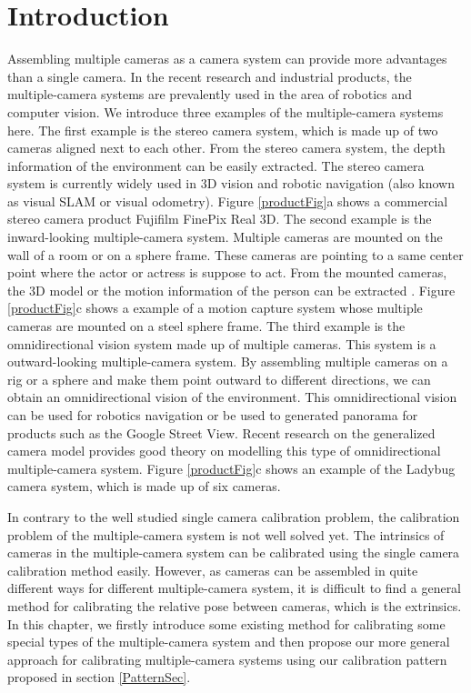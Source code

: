 \documentclass{report}
\begin{document}
\section{Introduction}
Assembling multiple cameras as a camera system can provide more advantages than a single camera. In the recent research and industrial products, the multiple-camera systems are prevalently used in the area of robotics and computer vision. We introduce three examples of the multiple-camera systems here. The first example is the stereo camera system, which is made up of two cameras aligned next to each other. From the stereo camera system, the depth information of the environment can be easily extracted. The stereo camera system is currently widely used in 3D vision and robotic navigation (also known as visual SLAM or visual odometry). Figure \ref{productFig}a shows a commercial stereo camera product Fujifilm FinePix Real 3D. The second example is the inward-looking multiple-camera system. Multiple cameras are mounted on the wall of a room or on a sphere frame. These cameras are pointing to a same center point where the actor or actress is suppose to act. From the mounted cameras, the 3D model or the motion information of the person can be extracted \cite{vlasic2009dynamic}. Figure \ref{productFig}c shows a example of a motion capture system whose multiple cameras are mounted on a steel sphere frame. The third example is the omnidirectional vision system made up of multiple cameras. This system is a outward-looking multiple-camera system. By assembling multiple cameras on a rig or a sphere and make them point outward to different directions, we can obtain an omnidirectional vision of the environment. This omnidirectional vision can be used for robotics navigation or be used to generated panorama for products such as the Google Street View. Recent research on the generalized camera model \cite{pless2003using} provides good theory on modelling this type of omnidirectional multiple-camera system. Figure \ref{productFig}c shows an example of the Ladybug camera system, which is made up of six cameras. 

In contrary to the well studied single camera calibration problem, the calibration problem of the multiple-camera system is not well solved yet. The intrinsics of cameras in the multiple-camera system can be calibrated using the single camera calibration method easily. However, as cameras can be assembled in quite different ways for different multiple-camera system, it is difficult to find a general method for calibrating the relative pose between cameras, which is the extrinsics. In this chapter, we firstly introduce some existing method for calibrating some special types of the multiple-camera system and then propose our more general approach for calibrating multiple-camera systems using our calibration pattern proposed in section \ref{PatternSec}. 
\end{document}
